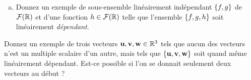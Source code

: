 \begin{prob}
\begin{enumerate}[a)]
\item Donnez un exemple de sous-ensemble linéairement indépendant $\{f, g\}$ de $\mathcal{F}(\mathbb{R})$ et d'une fonction $h\in \mathcal{F}(\mathbb{R})$ telle que l'ensemble $\{f,g,h\}$ soit linéairement {\it dépendant}. \medskip
 


\end{enumerate}

\end{prob} \begin{prob} \label{prob07.6} Donnez un exemple de trois vecteurs $\mathbf{u},\mathbf{v},\mathbf{w} \in \mathbb{R}^3$ tels que aucun des vecteurs n'est un multiple scalaire d'un autre, mais tels que $\{\mathbf{u},\mathbf{v},\mathbf{w}\}$ soit quand même linéairement dépendant. Est-ce possible si l'on se donnait seulement deux vecteurs au début ?

\end{prob}